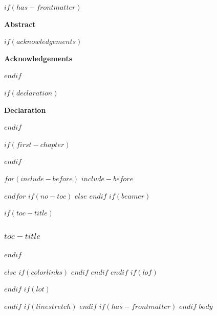 \documentclass[
$if(fontsize)$
  $fontsize$,
$endif$
$if(papersize)$
  $papersize$paper,
$else$
  paper=a4,
$endif$
$if(beamer)$
  ignorenonframetext,
$if(handout)$
  handout,
$endif$
$if(aspectratio)$
  aspectratio=$aspectratio$,
$endif$
$endif$
$for(classoption)$
  $classoption$$sep$,
$endfor$
  ,captions=tableheading
]{$if(beamer)$$documentclass$$else$$if(book)$scrbook$else$scrartcl$endif$$endif$}
\begin{document}

$if(has-frontmatter)$
\frontmatter
\frame{\titlepage}
{} %

\begin{center}
 {\LARGE \textbf{\textsf{Abstract}}}
\end{center}

\begin{abstract}
\begin{justify}
  $if(abstract)$
  $abstract$
  $endif$
\end{justify}
\end{abstract}
\pagebreak


$if(acknowledgements)$
\begin{center}
 {\LARGE \textbf{\textsf{Acknowledgements}}}
\end{center}

\begin{abstract}
\begin{justify}
$acknowledgements$
\end{justify}
\end{abstract}
\pagebreak

$endif$

$if(declaration)$
\begin{center}
 {\LARGE \textbf{\textsf{Declaration}}}
\end{center}

\begin{abstract}
\begin{justify}
  $declaration$ \par
   \vspace{1in}\raggedleft({\em $author$\/})
\end{justify}
\end{abstract}
\pagebreak



$endif$
\setcounter{page}{0} %


$if(first-chapter)$
\setcounter{chapter}{$first-chapter$}
\addtocounter{chapter}{-1}
$endif$

$for(include-before)$
$include-before$

$endfor$
$if(no-toc)$
$else$
\renewcommand*\contentsname{$toc-title$}
\renewcommand*\contentsname{Table of Contents}
$endif$
$if(beamer)$
\begin{frame}[allowframebreaks]
$if(toc-title)$
  \frametitle{$toc-title$}
$endif$
  \tableofcontents[hideallsubsections]
\end{frame}
\newpage
$else$
{
$if(colorlinks)$
\hypersetup{linkcolor=$if(toccolor)$$toccolor$$else$$endif$}
$endif$
\setcounter{tocdepth}{$toc-depth$}
\tableofcontents
\newpage
}
$endif$
$endif$
$if(lof)$
\listoffigures
$endif$
$if(lot)$
\listoftables
$endif$
$if(linestretch)$
$endif$
$if(has-frontmatter)$
\mainmatter
$endif$
$body$
\end{document}

